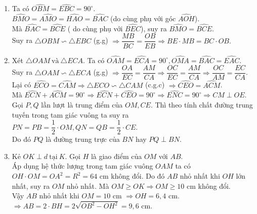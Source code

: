 \begin{ex}
{		\begin{enumerate}
			\item Ta có $\widehat{OBM}= \widehat{EBC}= 90^{\circ}$.\\
			$\widehat{BMO}= \widehat{AMO}= \widehat{HAO}= \widehat{BAC}$ (do cùng phụ với góc $\widehat{AOH}$).\\
			Mà $\widehat{BAC}= \widehat{BCE}$ ( do cùng phụ với $\widehat{BEC}$), suy ra $\widehat{BMO}= \widehat{BCE}$.\\
			Suy ra $\triangle OBM \backsim \triangle EBC$ (g.g) $\Rightarrow \dfrac{MB}{BC}= \dfrac{OB}{EB} \Rightarrow BE \cdot MB= BC \cdot OB.$
			\item Xét $\triangle OAM\ \text{và}\ \triangle ECA$. Ta có
			$\widehat{OAM}= \widehat{ECA}= 90^{\circ}, \widehat{OMA}= \widehat{BAC}= \widehat{EAC}$.\\
			Suy ra $\triangle OAM \backsim \triangle ECA$ (g.g) $\Rightarrow \dfrac{OA}{EC}= \dfrac{AM}{CA} \Rightarrow \dfrac{OC}{EC}= \dfrac{AM}{CA} \Rightarrow \dfrac{OC}{AM}= \dfrac{EC}{CA}$.\\
			Lại có $\widehat{ECO}= \widehat{CAM} \Rightarrow \triangle ECO \backsim \triangle CAM$ (c.g.c) $\Rightarrow \widehat{CEO}= \widehat{ACM}$.\\
			Mà $\widehat{ECN}+ \widehat{ACM}= 90^{\circ} \Rightarrow \widehat{ECN}+ \widehat{CEO}= 90^{\circ} \Rightarrow \widehat{ENC}= 90^{\circ} \Rightarrow CM \perp OE.$\\
			Gọi $P, Q$ lần lượt là trung điểm của $OM, CE$. Thì theo tính chất đường trung tuyến trong tam giác vuông ta suy ra
			$PN= PB= \dfrac{1}{2} \cdot OM, QN= QB= \dfrac{1}{2} \cdot CE.$\\
			Do đó $PQ$ là đường trung trực của $BN$ hay $PQ \perp BN$.
			\item Kẻ $OK \perp d\ \text{tại}\ K$. Gọi $H$ là giao điểm của $OM$ với $AB$.\\
			Áp dụng hệ thức lượng trong tam giác vuông $OAM$ ta có $OH \cdot OM= OA^2= R^2= 64$ cm không đổi. Do đó $AB$ nhỏ nhất khi $OH$ lớn nhất, suy ra $OM$ nhỏ nhất. Mà $OM \geq OK \Rightarrow OM \geq 10$ cm không đổi.\\
			Vậy $AB$ nhỏ nhất khi $OM= 10$ cm $\Rightarrow OH= 6{,}4$ cm.\\
			$ \Rightarrow AB= 2 \cdot BH= 2\sqrt{OB^2- OH^2}= 9{,}6$ cm. 
		\end{enumerate}
	}
\end{ex}
